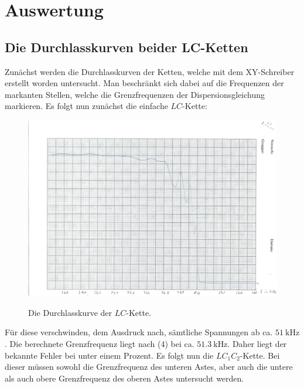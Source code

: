 
\section{Auswertung}
\label{sec:Auswertung}
\subsection{Die Durchlasskurven beider LC-Ketten}
Zunächst werden die Durchlasskurven der Ketten, welche mit dem XY-Schreiber
 erstellt worden untersucht. Man beschränkt sich dabei auf die Frequenzen der
  markanten Stellen, welche die Grenzfrequenzen der Dispersionsgleichung
	 markieren. Es folgt nun zunächst die einfache $LC$-Kette:

   \begin{figure}[H]
   	\centering
   	\caption{Die Durchlasskurve der $LC$-Kette.}
   	\includegraphics[width=\linewidth-70pt,height=\textheight-70pt,keepaspectratio]{content/Scans/LC.png}
   	\label{fig:Lc}
   \end{figure}

	 Für diese verschwinden, dem Ausdruck nach, sämtliche Spannungen ab ca.
	  $\SI{51}{\kilo\hertz}$. Die berechnete Grenzfrequenz liegt nach (4) bei
		 ca. $\SI{51,3}{\kilo\hertz}$. Daher liegt der bekannte Fehler bei
		  unter einem Prozent. Es folgt nun die $LC_1C_2$-Kette. Bei dieser müssen
			 sowohl die Grenzfrequenz des unteren Astes, aber auch die untere als auch obere Grenzfrequenz des
			  oberen Astes untersucht werden.

